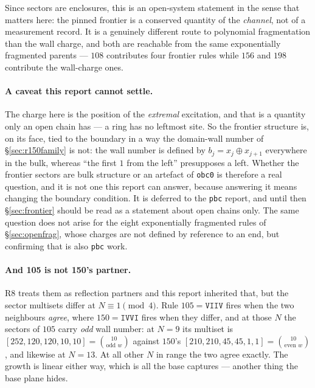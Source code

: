\documentclass[11pt]{article}
\newcommand{\rt}[1]{\texttt{#1}}
\theoremstyle{plain}
\theoremstyle{definition}
\begin{document}
Since sectors are enclosures, this is an open-system statement in the sense that
matters here: the pinned frontier is a conserved quantity of the \emph{channel},
not of a measurement record. It is a genuinely different route to polynomial
fragmentation than the wall charge, and both are reachable from the same
exponentially fragmented parents --- $108$ contributes four frontier rules while
$156$ and $198$ contribute the wall-charge ones.

\paragraph{A caveat this report cannot settle.} The charge here is the position of
the \emph{extremal} excitation, and that is a quantity only an open chain has ---
a ring has no leftmost site. So the frontier structure is, on its face, tied to
the boundary in a way the domain-wall number of \S\ref{sec:r150family} is not:
the wall number is defined by $b_j=x_j\oplus x_{j+1}$ everywhere in the bulk,
whereas ``the first $1$ from the left'' presupposes a left. Whether the frontier
sectors are bulk structure or an artefact of \rt{obc0} is therefore a real
question, and it is not one this report can answer, because answering it means
changing the boundary condition. It is deferred to the \rt{pbc} report, and until
then \S\ref{sec:frontier} should be read as a statement about open chains only.
The same question does not arise for the eight exponentially fragmented rules of
\S\ref{sec:openfrag}, whose charges are not defined by reference to an end, but
confirming that is also \rt{pbc} work.


\paragraph{And 105 is not 150's partner.} R8 treats them as reflection partners
and this report inherited that, but the sector multisets differ at
$N\equiv1\pmod4$. Rule $105=\rt{VIIV}$ fires when the two neighbours
\emph{agree}, where $150=\rt{IVVI}$ fires when they differ, and at those $N$ the
sectors of $105$ carry \emph{odd} wall number: at $N=9$ its multiset is
$[252,120,120,10,10]=\binom{10}{\text{odd }w}$ against $150$'s
$[210,210,45,45,1,1]=\binom{10}{\text{even }w}$, and likewise at $N=13$. At all
other $N$ in range the two agree exactly. The growth is linear either way, which
is all the base captures --- another thing the base plane hides.
\end{document}

